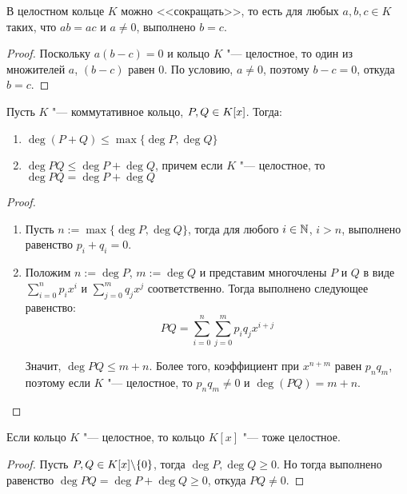 \begin{proposition}
	В целостном кольце $K$ можно <<сокращать>>, то есть для любых $a, b, c \in K$ таких, что $ab = ac$ и $a \ne 0$, выполнено $b = c$.
\end{proposition}

\begin{proof}
	Поскольку $a(b - c) = 0$ и кольцо $K$ "--- целостное, то один из множителей $a$, $(b - c)$ равен $0$. По условию, $a \ne 0$, поэтому $b - c = 0$, откуда $b = c$.
\end{proof}

\begin{proposition}
	Пусть $K$ "--- коммутативное кольцо, $P, Q \hm{\in} K[x]$. Тогда:
	\begin{enumerate}
		\item $\deg{(P + Q)} \le \max\{\deg{P}, \deg{Q}\}$
		\item $\deg{PQ} \le \deg{P} + \deg{Q}$, причем если $K$ "--- целостное, то $\deg{PQ} = \deg{P} + \deg{Q}$
	\end{enumerate}
\end{proposition}

\begin{proof}~
	\begin{enumerate}
		\item Пусть $n := \max\{\deg{P}, \deg{Q}\}$, тогда для любого $i \in \mathbb{N}$, $i > n$, выполнено равенство $p_i + q_i = 0$.
		\item Положим $n := \deg{P}$, $m := \deg{Q}$ и представим многочлены $P$ и $Q$ в виде $\sum_{i = 0}^{n}p_ix^i$ и $\sum_{j = 0}^{m}q_jx^j$ соответственно. Тогда выполнено следующее равенство:
		\[PQ = \sum_{i = 0}^{n}\sum_{j = 0}^{m}p_iq_jx^{i + j}\]
		
		Значит, $\deg{PQ} \le m + n$. Более того, коэффициент при $x^{n + m}$ равен $p_nq_m$, поэтому если $K$ "--- целостное, то $p_nq_m \ne 0$ и $\deg{(PQ)} = m + n$.\qedhere
	\end{enumerate}
\end{proof}

\begin{corollary}
	Если кольцо $K$ "--- целостное, то кольцо $K[x]$ "--- тоже целостное.
\end{corollary}

\begin{proof}
	Пусть $P, Q \in K[x] \backslash \{0\}$, тогда $\deg{P}, \deg{Q} \ge 0$. Но тогда выполнено равенство $\deg{PQ} = \deg{P} + \deg{Q} \ge 0$, откуда $PQ \ne 0$.
\end{proof}

